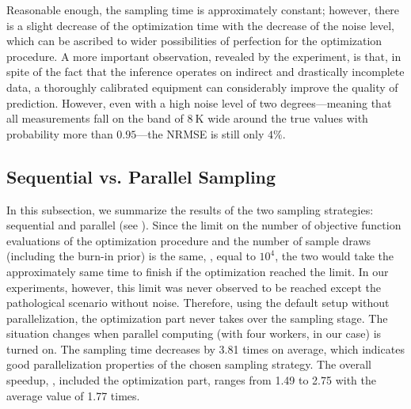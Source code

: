 Reasonable enough, the sampling time is approximately constant; however, there is a slight decrease of the optimization time with the decrease of the noise level, which can be ascribed to wider possibilities of perfection for the optimization procedure.
A more important observation, revealed by the experiment, is that, in spite of the fact that the inference operates on indirect and drastically incomplete data, a thoroughly calibrated equipment can considerably improve the quality of prediction. However, even with a high noise level of two degrees---meaning that all measurements fall on the band of $8~\text{K}$ wide around the true values with probability more than $0.95$---the NRMSE is still only $4\%$.

\subsection{Sequential vs. Parallel Sampling}
In this subsection, we summarize the results of the two sampling strategies: sequential and parallel (see ). Since the limit on the number of objective function evaluations of the optimization procedure and the number of sample draws (including the burn-in prior) is the same, \ie, equal to $10^4$, the two would take the approximately same time to finish if the optimization reached the limit. In our experiments, however, this limit was never observed to be reached except the pathological scenario without noise. Therefore, using the default setup without parallelization, the optimization part never takes over the sampling stage. The situation changes when parallel computing (with four workers, in our case) is turned on. The sampling time decreases by 3.81 times on average, which indicates good parallelization properties of the chosen sampling strategy. The overall speedup, \ie, included the optimization part, ranges from 1.49 to 2.75 with the average value of 1.77 times.
